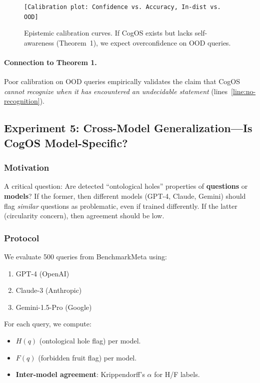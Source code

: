 \documentclass[11pt]{article}
\begin{document}
\begin{figure}[h]
\centering
\texttt{[Calibration plot: Confidence vs. Accuracy, In-dist vs. OOD]}
\caption{Epistemic calibration curves. If CogOS exists but lacks self-awareness (Theorem~1), we expect overconfidence on OOD queries.}
\label{fig:calibration}
\end{figure}

\paragraph{Connection to Theorem 1.} Poor calibration on OOD queries empirically validates the claim that CogOS \emph{cannot recognize when it has encountered an undecidable statement} (lines~\ref{line:no-recognition}).

\subsection{Experiment 5: Cross-Model Generalization—Is CogOS Model-Specific?}

\subsubsection{Motivation}

A critical question: Are detected ``ontological holes'' properties of \textbf{questions} or \textbf{models}? If the former, then different models (GPT-4, Claude, Gemini) should flag \emph{similar} questions as problematic, even if trained differently. If the latter (circularity concern), then agreement should be low.

\subsubsection{Protocol}

We evaluate 500 queries from BenchmarkMeta using:
\begin{enumerate}
    \item GPT-4 (OpenAI)
    \item Claude-3 (Anthropic)
    \item Gemini-1.5-Pro (Google)
\end{enumerate}

For each query, we compute:
\begin{itemize}
    \item $H(q)$ (ontological hole flag) per model.
    \item $F(q)$ (forbidden fruit flag) per model.
    \item \textbf{Inter-model agreement}: Krippendorff's $\alpha$ for H/F labels.
\end{itemize}
\end{document}
